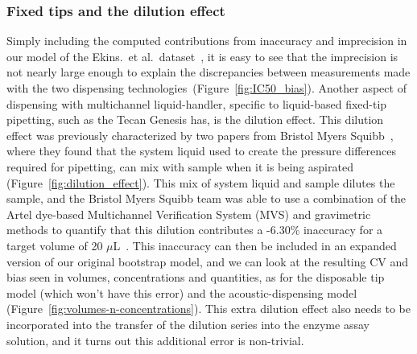 \documentclass[aps,pre,twocolumn,nofootinbib,superscriptaddress,linenumbers]{revtex4-1}
\begin{document}
\subsubsection*{Fixed tips and the dilution effect}

Simply including the computed contributions from inaccuracy and imprecision in our model of the  Ekins.~et al.~dataset~\cite{ekins_dispensing_2013}, it is easy to see that the imprecision is not nearly large enough to explain the discrepancies between measurements made with the two dispensing technologies~(Figure~\ref{fig:IC50_bias}).
Another aspect of dispensing with multichannel liquid-handler, specific to liquid-based fixed-tip pipetting, such as the Tecan Genesis has, is the dilution effect. 
This dilution effect was previously characterized by two papers from Bristol Myers Squibb~\cite{dong_use_2006,gu_dilution_2007}, where they found that the system liquid used to create the pressure differences required for pipetting, can mix with sample when it is being aspirated (Figure~\ref{fig:dilution_effect}). 
This mix of system liquid and sample dilutes the sample, and the Bristol Myers Squibb team was able to use a combination of the Artel dye-based Multichannel Verification System (MVS) and gravimetric methods to quantify that this dilution contributes a -6.30\% inaccuracy for a target volume of 20 $\mu$L~\cite{dong_use_2006}.
This inaccuracy can then be included in an expanded version of our original bootstrap model, and we can look at the resulting CV and bias seen in volumes, concentrations and quantities, as for the disposable tip model (which won't have this error) and the acoustic-dispensing model (Figure~\ref{fig:volumes-n-concentrations}).
This extra dilution effect also needs to be incorporated into the transfer of the dilution series into the enzyme assay solution, and it turns out this additional error is non-trivial.
\end{document}
